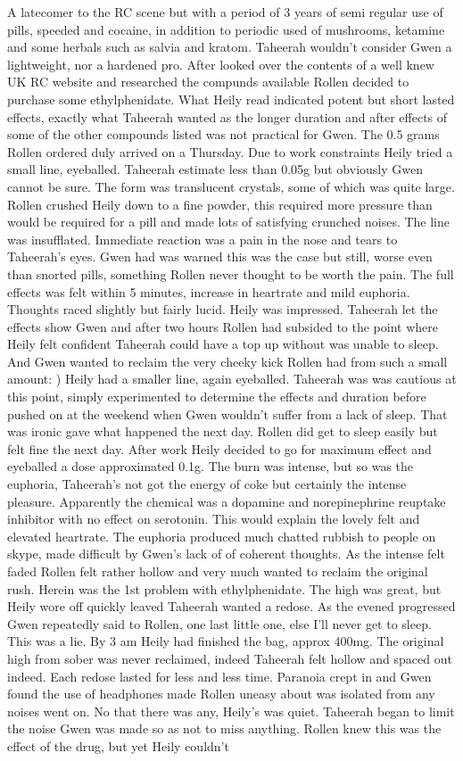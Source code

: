 \documentclass[12pt]{book}
\begin{document}
A latecomer to the RC scene but with a period of 3 years of semi regular use of pills, speeded and cocaine, in addition to periodic used of mushrooms, ketamine and some herbals such as salvia and kratom. Taheerah wouldn't consider Gwen a lightweight, nor a hardened pro. After looked over the contents of a well knew UK RC website and researched the compunds available Rollen decided to purchase some ethylphenidate. What Heily read indicated potent but short lasted effects, exactly what Taheerah wanted as the longer duration and after effects of some of the other compounds listed was not practical for Gwen. The 0.5 grams Rollen ordered duly arrived on a Thursday. Due to work constraints Heily tried a small line, eyeballed. Taheerah estimate less than 0.05g but obviously Gwen cannot be sure. The form was translucent crystals, some of which was quite large. Rollen crushed Heily down to a fine powder, this required more pressure than would be required for a pill and made lots of satisfying crunched noises. The line was insufflated. Immediate reaction was a pain in the nose and tears to Taheerah's eyes. Gwen had was warned this was the case but still, worse even than snorted pills, something Rollen never thought to be worth the pain. The full effects was felt within 5 minutes, increase in heartrate and mild euphoria. Thoughts raced slightly but fairly lucid. Heily was impressed. Taheerah let the effects show Gwen and after two hours Rollen had subsided to the point where Heily felt confident Taheerah could have a top up without was unable to sleep. And Gwen wanted to reclaim the very cheeky kick Rollen had from such a small amount: ) Heily had a smaller line, again eyeballed. Taheerah was was cautious at this point, simply experimented to determine the effects and duration before pushed on at the weekend when Gwen wouldn't suffer from a lack of sleep. That was ironic gave what happened the next day. Rollen did get to sleep easily but felt fine the next day. After work Heily decided to go for maximum effect and eyeballed a dose approximated 0.1g. The burn was intense, but so was the euphoria, Taheerah's not got the energy of coke but certainly the intense pleasure. Apparently the chemical was a dopamine and norepinephrine reuptake inhibitor with no effect on serotonin. This would explain the lovely felt and elevated heartrate. The euphoria produced much chatted rubbish to people on skype, made difficult by Gwen's lack of of coherent thoughts. As the intense felt faded Rollen felt rather hollow and very much wanted to reclaim the original rush. Herein was the 1st problem with ethylphenidate. The high was great, but Heily wore off quickly leaved Taheerah wanted a redose. As the evened progressed Gwen repeatedly said to Rollen, one last little one, else I'll never get to sleep. This was a lie. By 3 am Heily had finished the bag, approx 400mg. The original high from sober was never reclaimed, indeed Taheerah felt hollow and spaced out indeed. Each redose lasted for less and less time. Paranoia crept in and Gwen found the use of headphones made Rollen uneasy about was isolated from any noises went on. No that there was any, Heily's was quiet. Taheerah began to limit the noise Gwen was made so as not to miss anything. Rollen knew this was the effect of the drug, but yet Heily couldn't 
\end{document}

